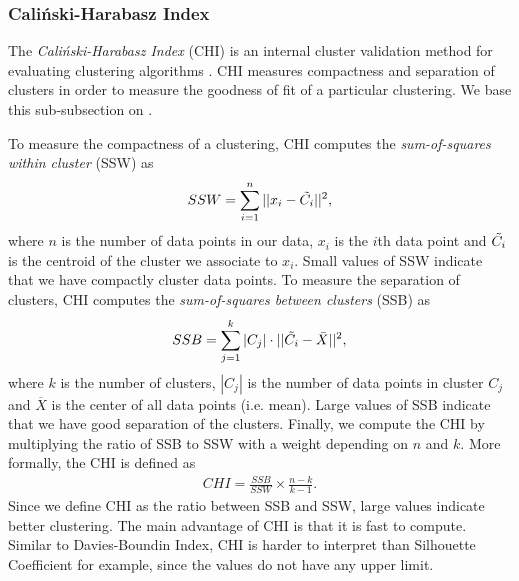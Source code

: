 \subsubsection{Caliński-Harabasz Index}
\label{sec:calinski-harabasz-index}
The \textit{Caliński-Harabasz Index} (CHI) is an internal cluster validation method for evaluating clustering algorithms \cite{CalinskiHarabasz1974}. CHI measures compactness and separation of clusters in order to measure the goodness of fit of a particular clustering. We base this sub-subsection on \cite{CalinskiHarabasz1974}.

To measure the compactness of a clustering, CHI computes the \textit{sum-of-squares within cluster} (SSW) as
\begin{align}
    SSW = \sum\limits_{i=1}^{n} ||x_i - \Tilde{C_i}||^2,
    \label{eqn:chi-ssw}
\end{align}
where $n$ is the number of data points in our data, $x_i$ is the $i$th data point and $\Tilde{C_i}$ is the centroid of the cluster we associate to $x_i$. Small values of SSW indicate that we have compactly cluster data points. To measure the separation of clusters, CHI computes the \textit{sum-of-squares between clusters} (SSB) as
\begin{align}
    SSB = \sum\limits_{j=1}^{k} |C_j| \cdot ||\Tilde{C_i} - \Bar{X}||^2,
    \label{eqn:chi-ssb}
\end{align}
where $k$ is the number of clusters, $|C_j|$ is the number of data points in cluster $C_j$ and $\overline{X}$ is the center of all data points (i.e. mean). Large values of SSB indicate that we have good separation of the clusters. Finally, we compute the CHI by multiplying the ratio of SSB to SSW with a weight depending on $n$ and $k$. More formally, the CHI is defined as
\begin{align}
    CHI = \frac{SSB}{SSW} \times \frac{n - k}{k - 1}.
    \label{eqn:chi}
\end{align}
Since we define CHI as the ratio between SSB and SSW, large values indicate better clustering. The main advantage of CHI is that it is fast to compute. Similar to Davies-Boundin Index, CHI is harder to interpret than Silhouette Coefficient for example, since the values do not have any upper limit.

